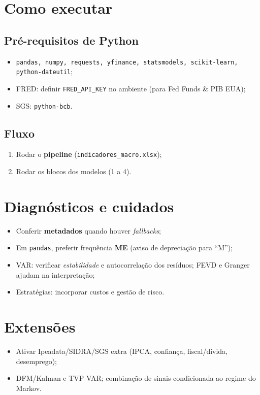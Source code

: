 \documentclass[11pt,a4paper]{article}
\begin{document}
\section{Como executar}
\subsection*{Pré-requisitos de Python}
\begin{itemize}
  \item \texttt{pandas, numpy, requests, yfinance, statsmodels, scikit-learn, python-dateutil};
  \item FRED: definir \texttt{FRED\_API\_KEY} no ambiente (para Fed Funds \& PIB EUA);
  \item SGS: \texttt{python-bcb}.
\end{itemize}

\subsection*{Fluxo}
\begin{enumerate}
  \item Rodar o \textbf{pipeline} (\texttt{indicadores\_macro.xlsx});
  \item Rodar os blocos dos modelos (1 a 4).
\end{enumerate}

\section{Diagnósticos e cuidados}
\begin{itemize}
  \item Conferir \textbf{metadados} quando houver \emph{fallbacks};
  \item Em \texttt{pandas}, preferir frequência \textbf{ME} (aviso de depreciação para ``M'');
  \item VAR: verificar \emph{estabilidade} e autocorrelação dos resíduos; FEVD e Granger ajudam na interpretação;
  \item Estratégias: incorporar custos e gestão de risco.
\end{itemize}

\section{Extensões}
\begin{itemize}
  \item Ativar Ipeadata/SIDRA/SGS extra (IPCA, confiança, fiscal/dívida, desemprego);
  \item DFM/Kalman e TVP-VAR; combinação de sinais condicionada ao regime do Markov.
\end{itemize}
\end{document}
